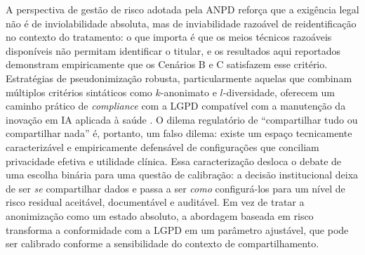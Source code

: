 A perspectiva de gestão de risco adotada pela ANPD \cite{ANPD2023computacional} reforça que a exigência legal não é de inviolabilidade absoluta, mas de inviabilidade razoável de reidentificação no contexto do tratamento: o que importa é que os meios técnicos razoáveis disponíveis não permitam identificar o titular, e os resultados aqui reportados demonstram empiricamente que os Cenários B e C satisfazem esse critério. Estratégias de pseudonimização robusta, particularmente aquelas que combinam múltiplos critérios sintáticos como $k$-anonimato e $l$-diversidade, oferecem um caminho prático de \textit{compliance} com a LGPD compatível com a manutenção da inovação em IA aplicada à saúde \cite{ANPD2023juridica, GDPR2016}. O dilema regulatório de ``compartilhar tudo ou compartilhar nada'' é, portanto, um falso dilema: existe um espaço tecnicamente caracterizável e empiricamente defensável de configurações que conciliam privacidade efetiva e utilidade clínica. Essa caracterização desloca o debate de uma escolha binária para uma questão de calibração: a decisão institucional deixa de ser \textit{se} compartilhar dados e passa a ser \textit{como} configurá-los para um nível de risco residual aceitável, documentável e auditável. Em vez de tratar a anonimização como um estado absoluto, a abordagem baseada em risco transforma a conformidade com a LGPD em um parâmetro ajustável, que pode ser calibrado conforme a sensibilidade do contexto de compartilhamento.
